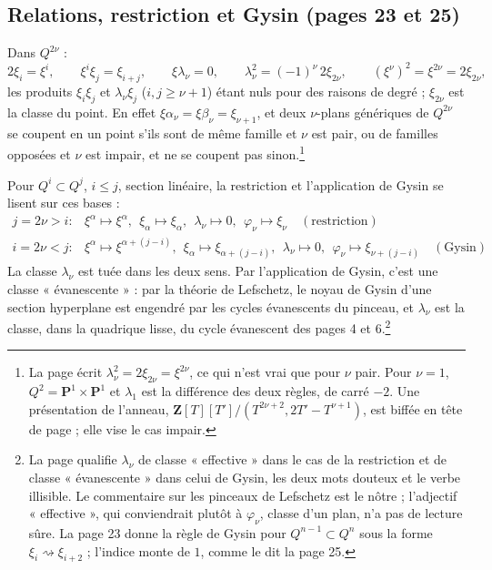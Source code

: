 \documentclass[11pt,a4paper]{article}
\begin{document}
\subsection*{Relations, restriction et Gysin (pages 23 et 25)}

Dans $Q^{2\nu}$ :
\[
  2\xi_{i} = \xi^{i}, \qquad \xi^{i}\xi_{j} = \xi_{i+j}, \qquad
  \xi\lambda_{\nu} = 0, \qquad
  \lambda_{\nu}^{2} = (-1)^{\nu}\, 2\xi_{2\nu}, \qquad
  (\xi^{\nu})^{2} = \xi^{2\nu} = 2\xi_{2\nu},
\]
les produits $\xi_{i}\xi_{j}$ et $\lambda_{\nu}\xi_{j}$ ($i, j \geq \nu + 1$)
étant nuls pour des raisons de degré ; $\xi_{2\nu}$ est la classe du point.
En effet $\xi\alpha_{\nu} = \xi\beta_{\nu} = \xi_{\nu+1}$, et deux
$\nu$-plans génériques de $Q^{2\nu}$ se coupent en un point s'ils sont de
même famille et $\nu$ est pair, ou de familles opposées et $\nu$ est
impair, et ne se coupent pas sinon.\footnote{La page écrit
$\lambda_{\nu}^{2} = 2\xi_{2\nu} = \xi^{2\nu}$, ce qui n'est vrai que pour
$\nu$ pair. Pour $\nu = 1$, $Q^{2} = \mathbf{P}^{1} \times \mathbf{P}^{1}$
et $\lambda_{1}$ est la différence des deux règles, de carré $-2$. Une
présentation de l'anneau, $\mathbf{Z}[T][T']/(T^{2\nu+2}, 2T' - T^{\nu+1})$,
est biffée en tête de page ; elle vise le cas impair.}

Pour $Q^{i} \subset Q^{j}$, $i \leq j$, section linéaire, la restriction et
l'application de Gysin se lisent sur ces bases :
\[
  \begin{array}{ll}
    j = 2\nu > i : &
      \xi^{\alpha} \mapsto \xi^{\alpha}, \ \ \xi_{\alpha} \mapsto \xi_{\alpha}, \ \
      \lambda_{\nu} \mapsto 0, \ \ \varphi_{\nu} \mapsto \xi_{\nu}
      \quad (\text{restriction}) \\[4pt]
    i = 2\nu < j : &
      \xi^{\alpha} \mapsto \xi^{\alpha+(j-i)}, \ \ \xi_{\alpha} \mapsto \xi_{\alpha+(j-i)}, \ \
      \lambda_{\nu} \mapsto 0, \ \ \varphi_{\nu} \mapsto \xi_{\nu+(j-i)}
      \quad (\text{Gysin})
  \end{array}
\]
La classe $\lambda_{\nu}$ est tuée dans les deux sens. Par l'application de
Gysin, c'est une classe « évanescente » : par la théorie de Lefschetz,
le noyau de Gysin d'une section hyperplane est engendré par les cycles
évanescents du pinceau, et $\lambda_{\nu}$ est la classe, dans la quadrique lisse, du cycle
évanescent des pages 4 et 6.\footnote{La page qualifie $\lambda_{\nu}$ de classe
« effective » dans le cas de la restriction et de classe
« évanescente » dans celui de Gysin, les deux mots douteux
et le verbe illisible. Le commentaire sur les pinceaux de Lefschetz est le
nôtre ; l'adjectif « effective », qui conviendrait plutôt à
$\varphi_{\nu}$, classe d'un plan, n'a pas de lecture sûre. La page 23
donne la règle de Gysin pour $Q^{n-1} \subset Q^{n}$ sous la forme
$\xi_{i} \rightsquigarrow \xi_{i+2}$ ; l'indice monte de $1$, comme le dit
la page 25.}
\end{document}
